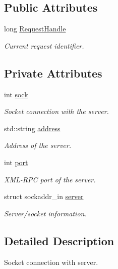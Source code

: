 \subsection*{Public Attributes}
\begin{DoxyCompactItemize}
\item 
long \hyperlink{classTcpClient_a57ffabce89de6e0f07a3717758f67fe6}{Request\-Handle}
\begin{DoxyCompactList}\small\item\em Current request identifier. \end{DoxyCompactList}\end{DoxyCompactItemize}
\subsection*{Private Attributes}
\begin{DoxyCompactItemize}
\item 
int \hyperlink{classTcpClient_af93f7c8c4d91d93379ba99fd3742c3dc}{sock}
\begin{DoxyCompactList}\small\item\em Socket connection with the server. \end{DoxyCompactList}\item 
std\-::string \hyperlink{classTcpClient_a8bcb24ebf1d8e22e9185f3056fd108c4}{address}
\begin{DoxyCompactList}\small\item\em Address of the server. \end{DoxyCompactList}\item 
int \hyperlink{classTcpClient_aa112ef0470437e790931b3ec9c98a800}{port}
\begin{DoxyCompactList}\small\item\em X\-M\-L-\/\-R\-P\-C port of the server. \end{DoxyCompactList}\item 
struct sockaddr\-\_\-in \hyperlink{classTcpClient_a75a8bd28eca3f1eea17fb430ab14cade}{server}
\begin{DoxyCompactList}\small\item\em Server/socket information. \end{DoxyCompactList}\end{DoxyCompactItemize}


\subsection{Detailed Description}
Socket connection with server. 

